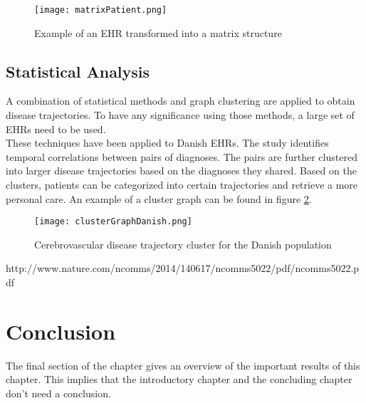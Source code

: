 \begin{figure}[H]
	\centering
	\texttt{[image: matrixPatient.png]}
	\caption{Example of an EHR transformed into a matrix structure \cite{EHRrecommender:article}}
	\label{fig:matrixPatient}
\end{figure}


\subsection{Statistical Analysis}

A combination of statistical methods and graph clustering are applied to obtain disease trajectories. To have any significance using those methods, a large set of EHRs need to be used. \\
These techniques have been applied to Danish EHRs. The study identifies temporal correlations between pairs of diagnoses. The pairs are further clustered into larger disease trajectories based on the diagnoses they shared. Based on the clusters, patients can be categorized into certain trajectories and retrieve a more personal care. An example of a cluster graph can be found in figure \ref{fig:clusterGraphDanish}.

\begin{figure}[H]
	\centering
	\texttt{[image: clusterGraphDanish.png]}
	\caption{Cerebrovascular disease trajectory cluster for the Danish population \cite{Brunak:article}}
	\label{fig:clusterGraphDanish}
\end{figure}

http://www.nature.com/ncomms/2014/140617/ncomms5022/pdf/ncomms5022.pdf


\section{Conclusion}
The final section of the chapter gives an overview of the important results
of this chapter. This implies that the introductory chapter and the
concluding chapter don't need a conclusion.



